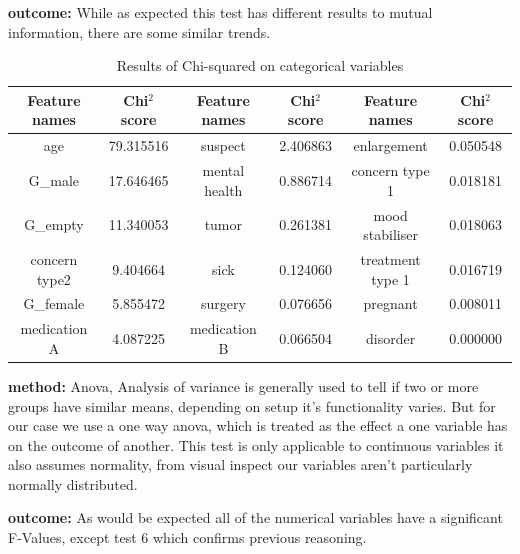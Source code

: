 \documentclass[a4paper]{article}
\begin{document}
\textbf{outcome:} While as expected this test has different results to mutual information, there are some similar trends.

\begin{table}[h]
\begin{adjustwidth}{-0.8cm}{}
    \centering
    \begin{tabular}{|c|c|c|c|c|c|}
    \hline
        Feature names & Chi$^{2}$ score & Feature names & Chi$^{2}$ score & Feature names & Chi$^{2}$ score\\
    \hline
        age           & 79.315516 & suspect       & 2.406863 & enlargement      & 0.050548 \\
    \hline         
        G\_male       & 17.646465 & mental health & 0.886714 & concern type 1   & 0.018181 \\
    \hline         
        G\_empty      & 11.340053 & tumor         & 0.261381 & mood stabiliser  & 0.018063 \\
    \hline         
        concern type2 & 9.404664  & sick          & 0.124060 & treatment type 1 & 0.016719 \\
    \hline         
        G\_female     & 5.855472  & surgery       & 0.076656 & pregnant         & 0.008011 \\
    \hline         
        medication A  & 4.087225  & medication B  & 0.066504 & disorder         & 0.000000 \\
    \hline         
    \end{tabular}
    \caption{Results of Chi-squared on categorical variables}
    \label{tab:Chi-squared}
\end{adjustwidth}
\end{table}

\textbf{method:} Anova, Analysis of variance is generally used to tell if two or more groups have similar means, depending on setup it's functionality varies. But for our case we use a one way anova, which is treated as the effect a one variable has on the outcome of another. This test is only applicable to continuous variables it also assumes normality, from visual inspect our variables aren't particularly normally distributed.

\textbf{outcome:} As would be expected all of the numerical variables have a significant F-Values, except test 6 which confirms previous reasoning.
\end{document}
